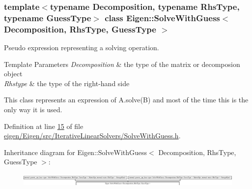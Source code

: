 \subsubsection*{template$<$typename Decomposition, typename Rhs\+Type, typename Guess\+Type$>$\newline
class Eigen\+::\+Solve\+With\+Guess$<$ Decomposition, Rhs\+Type, Guess\+Type $>$}

Pseudo expression representing a solving operation. 


\begin{DoxyTemplParams}{Template Parameters}
{\em Decomposition} & the type of the matrix or decomposion object \\
\hline
{\em Rhstype} & the type of the right-\/hand side\\
\hline
\end{DoxyTemplParams}
This class represents an expression of A.\+solve(\+B) and most of the time this is the only way it is used. 

Definition at line \hyperlink{eigen_2_eigen_2src_2_iterative_linear_solvers_2_solve_with_guess_8h_source_l00015}{15} of file \hyperlink{eigen_2_eigen_2src_2_iterative_linear_solvers_2_solve_with_guess_8h_source}{eigen/\+Eigen/src/\+Iterative\+Linear\+Solvers/\+Solve\+With\+Guess.\+h}.

Inheritance diagram for Eigen\+:\+:Solve\+With\+Guess$<$ Decomposition, Rhs\+Type, Guess\+Type $>$\+:\begin{figure}[H]
\begin{center}
\leavevmode
\includegraphics[height=0.660377cm]{group___iterative_linear_solvers___module}
\end{center}
\end{figure}
